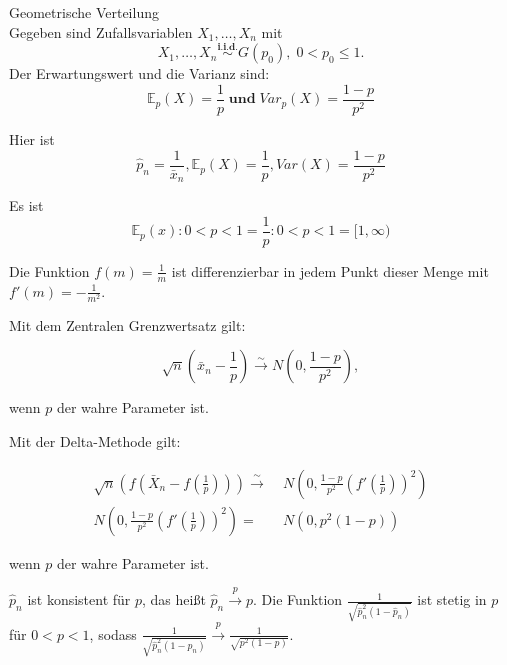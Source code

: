 \documentclass[10pt]{article}
\newcommand{\FZV}{X_1, \ldots, X_n} %
\newcommand{\EW}{\mathbb{E}} %
\newcommand{\KW}{\overset{p} \longrightarrow} %
\newcommand{\KV}{\overset{\sim} \longrightarrow} %
\newenvironment{BSP}[1][]
{\begin{Beispiel}[frametitle=#1]}{\end{Beispiel}}
\begin{document}
	\begin{BSP}[Beispiel 1..... (Delta-Methode)]		
		Geometrische Verteilung \\
		Gegeben sind Zufallsvariablen $\FZV$ mit
		\begin{equation*}
			\FZV \overset{\textbf{i.i.d.}}{\sim} G(p_0), \; 0 < p_0 \leq 1.
		\end{equation*} 
		Der Erwartungswert und die Varianz sind:
		\begin{equation*}
			\EW_p(X) = \frac{1}{p} \; \textbf{und} \; Var_p(X) = \frac{1-p}{p^2}
		\end{equation*}
		
		Hier ist
		\begin{equation*}
			\hat{p}_n = \frac{1}{\bar{x}_n}, \EW_p(X) = \frac{1}{p}, Var(X) = \frac{1-p}{p^2} 
		\end{equation*}
		
		Es ist
		\begin{equation*}
			{\EW_p(x) : 0<p<1} = {\frac{1}{p}: 0<p<1} = [1, \infty)
		\end{equation*}
		
		Die Funktion $f(m)= \frac{1}{m}$ ist differenzierbar in jedem Punkt dieser Menge mit $f'(m)= - \frac{1}{m^2}$. 
		
		Mit dem Zentralen Grenzwertsatz gilt:
		
		\begin{equation*}
			\sqrt{n}\left(\bar{x}_n - \frac{1}{p}\right) \KV N\left(0, \frac{1-p}{p^2}\right),
		\end{equation*}
		
		wenn $p$ der wahre Parameter ist. 
		
		Mit der Delta-Methode gilt:
		
		\begin{equation*}
			\begin{split}
				\sqrt{n} \left(f\left(\bar{X}_n-f\left(\frac{1}{p}\right)\right)\right) \KV&\; N\left(0,\frac{1-p}{p^2}\left(f'\left(\frac{1}{p}\right)\right)^2\right) \\
				N\left(0,\frac{1-p}{p^2}\left(f'\left(\frac{1}{p}\right)\right)^2\right) = &\;N(0,p^2(1-p))
			\end{split}
		\end{equation*}
		
		wenn $p$ der wahre Parameter ist.
		
		$\hat{p}_n$ ist konsistent für $p$, das heißt $\hat{p}_n \KW p$.
		Die Funktion $\frac{1}{\sqrt{\hat{p}_n^2(1-\hat{p}_n)}}$ ist stetig in $p$ für $0<p<1$, sodass  $\frac{1}{\sqrt{\hat{p}_n^2(1-\hat{p}_n)}} \KW  \frac{1}{\sqrt{p^2(1-p)}}$.
		

\end{BSP}
\end{document}
